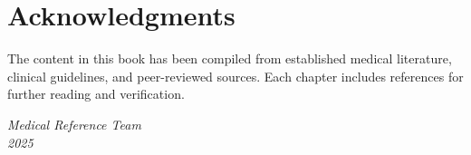 \section*{Acknowledgments}
The content in this book has been compiled from established medical literature, clinical guidelines, and peer-reviewed sources. Each chapter includes references for further reading and verification.

\vspace{1cm}

\noindent \textit{Medical Reference Team}\\
\textit{2025}

\clearpage
